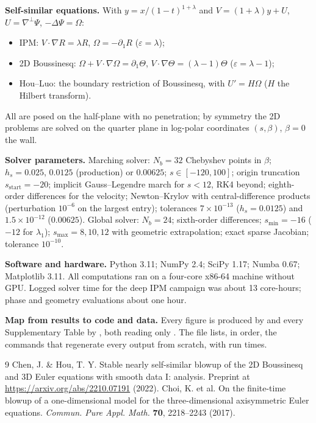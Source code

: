 \documentclass[10pt]{article}
\newcommand{\sstart}{s_{\mathrm{start}}}
\begin{document}
\textbf{Self-similar equations.} With $y=x/(1-t)^{1+\lambda}$ and $V=(1+\lambda)y+U$, $U=\nabla^\perp\Psi$,
$-\Delta\Psi=\Omega$:
\begin{itemize}
\item IPM: $V\cdot\nabla R=\lambda R$, $\Omega=-\partial_1R$ ($\varepsilon=\lambda$);
\item 2D Boussinesq: $\Omega+V\cdot\nabla\Omega=\partial_1\Theta$, $V\cdot\nabla\Theta=(\lambda-1)\Theta$
($\varepsilon=\lambda-1$);
\item Hou--Luo: the boundary restriction of Boussinesq, with $U'=H\Omega$ ($H$ the Hilbert transform).
\end{itemize}
All are posed on the half-plane with no penetration; by symmetry the 2D problems are solved on the quarter plane in
log-polar coordinates $(s,\beta)$, $\beta=0$ the wall.

\textbf{Solver parameters.} Marching solver: $N_b=32$ Chebyshev points in $\beta$; $h_s=0.025$, $0.0125$ (production)
or $0.00625$; $s\in[-120,100]$; origin truncation $\sstart=-20$; implicit Gauss--Legendre march for $s<12$, RK4
beyond; eighth-order differences for the velocity; Newton--Krylov with central-difference products (perturbation
$10^{-6}$ on the largest entry); tolerances $7\times10^{-13}$ ($h_s=0.0125$) and $1.5\times10^{-12}$ ($0.00625$).
Global solver: $N_b=24$; sixth-order differences; $s_{\min}=-16$ ($-12$ for $\lambda_1$); $s_{\max}=8,10,12$ with
geometric extrapolation; exact sparse Jacobian; tolerance $10^{-10}$.

\textbf{Software and hardware.} Python 3.11; NumPy 2.4; SciPy 1.17; Numba 0.67; Matplotlib 3.11. All computations
ran on a four-core x86-64 machine without GPU. Logged solver time for the deep IPM campaign was about 13 core-hours;
phase and geometry evaluations about one hour.

\textbf{Map from results to code and data.} Every figure is produced by  and
every Supplementary Table by , both reading only . The file
 lists, in order, the commands that regenerate every output from scratch, with run times.

\begin{thebibliography}{9}
\small
{} Chen, J. \& Hou, T. Y. Stable nearly self-similar blowup of the 2D Boussinesq and 3D Euler
equations with smooth data I: analysis. Preprint at \url{https://arxiv.org/abs/2210.07191} (2022).
 Choi, K. et al. On the finite-time blowup of a one-dimensional model for the three-dimensional
axisymmetric Euler equations. \textit{Commun. Pure Appl. Math.} \textbf{70}, 2218--2243 (2017).
\end{thebibliography}
\end{document}
